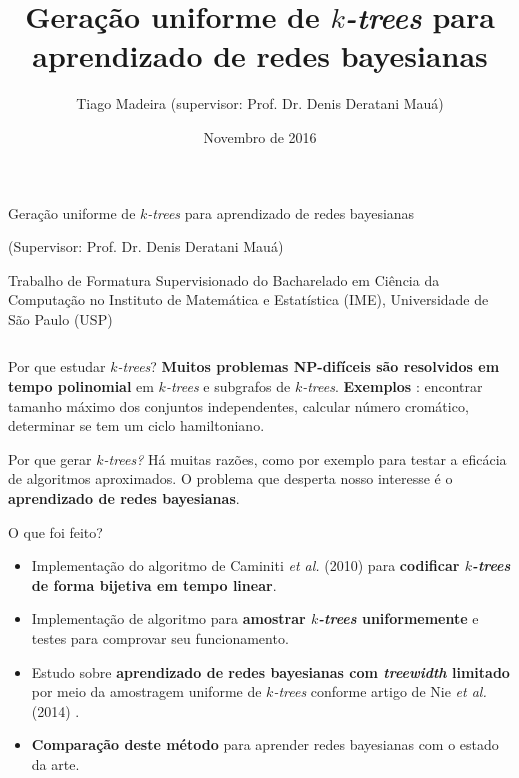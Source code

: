 \documentclass{beamer}
\title{Geração uniforme de \emph{$k$-trees} para aprendizado de redes bayesianas}
\author{Tiago Madeira (supervisor: Prof. Dr. Denis Deratani Mauá)}
\date{Novembro de 2016}
\begin{document}
\begin{frame}
\begin{center}
  {\Huge Geração uniforme de \emph{$k$-trees} para aprendizado de redes bayesianas}

  \vspace{0.5em}

  { {\small (Supervisor: Prof. Dr. Denis Deratani Mauá)}}

  \vspace{0.2em}

  {\small Trabalho de Formatura Supervisionado do Bacharelado em Ciência da Computação no Instituto de Matemática e Estatística (IME), Universidade de São Paulo (USP)}
\end{center}

\vspace*{-0.8cm}

\begin{columns}[t]
\begin{column}{.5\textwidth}
  \begin{block}{Por que estudar \emph{$k$-trees}?}
    \textbf{Muitos problemas NP-difíceis são resolvidos em tempo polinomial} em \emph{$k$-trees} e subgrafos de \emph{$k$-trees}. \textbf{Exemplos} \cite{arnborg}: encontrar tamanho máximo dos conjuntos independentes, calcular número cromático, determinar se tem um ciclo hamiltoniano.
  \end{block}

  \begin{block}{Por que gerar \emph{$k$-trees?}}
    Há muitas razões, como por exemplo para testar a eficácia de algoritmos aproximados. O problema que desperta nosso interesse é o \textbf{aprendizado de redes bayesianas}.
  \end{block}

  \begin{block}{O que foi feito?}
    \begin{itemize}
      \item Implementação do algoritmo de Caminiti \emph{et al.} (2010) \cite{caminiti} para \textbf{codificar \emph{$k$-trees} de forma bijetiva em tempo linear}.
      \item Implementação de algoritmo para \textbf{amostrar \emph{$k$-trees} uniformemente} e testes para comprovar seu funcionamento.
      \item Estudo sobre \textbf{aprendizado de redes bayesianas com \emph{treewidth} limitado} por meio da amostragem uniforme de \emph{$k$-trees} conforme artigo de Nie \emph{et al.} (2014) \cite{maua}.
      \item \textbf{Comparação deste método} para aprender redes bayesianas com o estado da arte.
    \end{itemize}
  \end{block}


\end{column}
\end{columns}
\end{frame}
\end{document}
